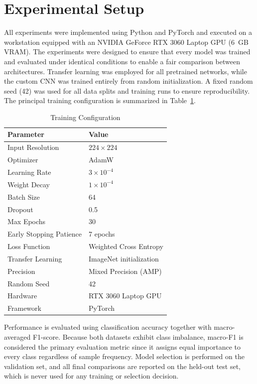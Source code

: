 \documentclass[conference]{IEEEtran}
\begin{document}
\section{Experimental Setup}
All experiments were implemented using Python and PyTorch and executed on a workstation equipped with an NVIDIA GeForce RTX 3060 Laptop GPU (6~GB VRAM). The experiments were designed to ensure that every model was trained and evaluated under identical conditions to enable a fair comparison between architectures. Transfer learning was employed for all pretrained networks, while the custom CNN was trained entirely from random initialization. A fixed random seed (42) was used for all data splits and training runs to ensure reproducibility. The principal training configuration is summarized in Table~\ref{tab:config}.

\begin{table}[htbp]
\caption{Training Configuration}
\begin{center}
\begin{tabular}{ll}
\toprule
\textbf{Parameter} & \textbf{Value} \\
\midrule
Input Resolution & $224 \times 224$ \\
Optimizer & AdamW \\
Learning Rate & $3\times10^{-4}$ \\
Weight Decay & $1\times10^{-4}$ \\
Batch Size & 64 \\
Dropout & 0.5 \\
Max Epochs & 30 \\
Early Stopping Patience & 7 epochs \\
Loss Function & Weighted Cross Entropy \\
Transfer Learning & ImageNet initialization \\
Precision & Mixed Precision (AMP) \\
Random Seed & 42 \\
Hardware & RTX 3060 Laptop GPU \\
Framework & PyTorch \\
\bottomrule
\end{tabular}
\label{tab:config}
\end{center}
\end{table}

Performance is evaluated using classification accuracy together with macro-averaged F1-score. Because both datasets exhibit class imbalance, macro-F1 is considered the primary evaluation metric since it assigns equal importance to every class regardless of sample frequency. Model selection is performed on the validation set, and all final comparisons are reported on the held-out test set, which is never used for any training or selection decision.
\end{document}
